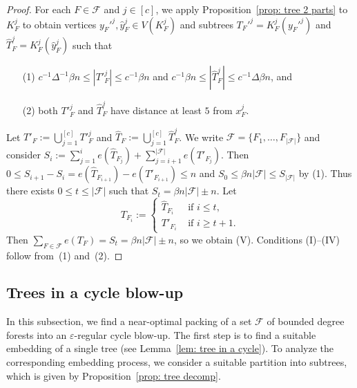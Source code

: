 \documentclass[a4paper, 11pt, reqno]{amsart}
\numberwithin{equation}{section}
\newcommand{\1}{{\rm 1\hspace*{-0.4ex}%
\rule{0.1ex}{1.52ex}\hspace*{0.2ex}}}
\newcommand{\cF}{\mathcal{F}}
\renewcommand{\epsilon}{\varepsilon}
\newcounter{step}
\begin{document}
\begin{proof}
For each $F\in \cF$ and $j\in [c]$, 
we apply Proposition~\ref{prop: tree 2 parts} to $K^j_F$ to obtain 
vertices $y_F'^j, \hat{y}_F^j\in V(K_F^j)$ and subtrees $T_F'^j=K_F^j(y_F'^j)$ and $\hat{T}_F^j=K_F^j(\hat{y}_F^j)$
such that
\begin{itemize}
\item[(1)] $c^{-1}\Delta^{-1}\beta n \leq |T'^j_{F}|\leq c^{-1}\beta n$ and $c^{-1}\beta n \leq |\hat{T}^j_{F}|\leq c^{-1}\Delta\beta n$, and
\item[(2)] both $T'^j_F$ and $\hat{T}^j_F$ have distance at least $5$ from $x^j_F$.
\end{itemize} 
Let $T'_F:= \bigcup_{j=1}^{[c]} T'^j_F$ and $\hat{T}_F:=\bigcup_{j=1}^{[c]}\hat{T}^j_F$. 
We write $\cF=\{F_1,\dots, F_{|\cF|}\}$ and consider $S_i:= \sum_{j=1}^{i} e(\hat{T}_{F_j}) + \sum_{j=i+1}^{|\cF|} e(T'_{F_j})$. Then $0\leq S_{i+1}-S_i = e(\hat{T}_{F_{i+1}})- e(T'_{F_{i+1}}) \leq n$ and $S_0\leq \beta n|\cF| \leq S_{|\cF|}$ by (1).
Thus there exists $0\leq t\leq |\cF|$ such that $S_t = \beta n |\cF|\pm n$. 
Let 
$$
T_{F_i}:= \left \{ \begin{array}{ll}
\hat{T}_{F_i} & \text{ if } i\leq t, \\
T'_{F_i} & \text{ if } i\geq t+1.
\end{array}\right.
$$
Then $\sum_{F\in \cF} e(T_F) = S_t = \beta  n |\cF| \pm n$, so we obtain (V).
Conditions (I)--(IV) follow from~(1) and~(2).
\end{proof}



\subsection{Trees in a cycle blow-up}
In this subsection, we find a near-optimal packing of a set $\cF$ of bounded degree forests into an $\epsilon$-regular cycle blow-up. The first step is to find a suitable embedding of a single tree (see Lemma~\ref{lem: tree in a cycle}). To analyze the corresponding embedding process, we consider a suitable partition into subtrees, which is given by Proposition~\ref{prop: tree decomp}.
\end{document}
